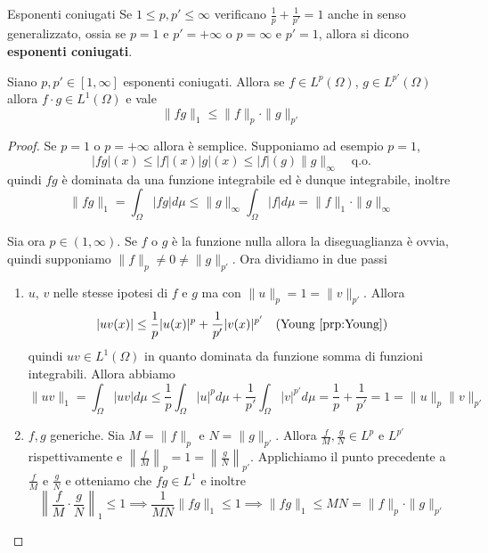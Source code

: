 \begin{definition}[label=def:coniugati]{Esponenti coniugati}
    Se \(1 \le p, p' \le \infty\) verificano \(\frac{1}{p} + \frac{1}{p'} = 1\)
    anche in senso generalizzato, ossia se \(p = 1\) e \(p' = +\infty\) o \(p =
    \infty \) e \(p' = 1\), allora si dicono \textbf{esponenti coniugati}.
\end{definition}

\begin{theorem}\label{thm:Holder}
    Siano \(p, p' \in [1, \infty]\) esponenti coniugati. Allora se \(f \in
    L^{p}{(\Omega)}\), \(g \in L^{p'}{(\Omega)}\) allora \(f\cdot g \in
    L^{1}{(\Omega)}\) e vale
    \[
        \|fg\|_1 \le \|f\|_p \cdot \|g\|_{p'}
    \]
\end{theorem}
\begin{proof}
    Se \(p = 1\) o \(p = +\infty\) allora è semplice. Supponiamo
    ad esempio \(p = 1\), 
    \[
        |fg|{(x)} \le |f|{(x)}|g|{(x)} \le |f|{(g)} \|g\|_{\infty} \quad \text{
        q.o.}
    \]
    quindi \(fg\) è dominata da una funzione integrabile ed è dunque
    integrabile, inoltre
    \[
        \|fg\|_1 = \int_\Omega |fg| d\mu \le \|g\|_\infty \int_\Omega |f| d\mu = \|f\|_1 \cdot \|g\|_\infty
    \]

    Sia ora \(p \in (1, \infty)\). Se \(f\) o \(g\) è la funzione nulla allora
    la diseguaglianza è ovvia, quindi supponiamo \(\|f\|_p \neq 0 \neq
    \|g\|_{p'} \). Ora dividiamo in due passi
\begin{enumerate}[label = \arabic*.]
    \item \(u\), \(v\) nelle stesse ipotesi di \(f\) e \(g\) ma con \(\|u\|_p =
        1 = \|v\|_{p'} \). Allora
        \[
            |uv{(x)}| \le  \frac{1}{p}|u{(x)}|^{p} + \frac{1}{ p' }|v{(x)}|^{p'}
            \quad \text{(Young~\ref{prp:Young})}
        \]
        quindi \(uv \in L^{1}(\Omega)\) in quanto dominata da funzione somma di
        funzioni integrabili. Allora abbiamo
        \[
            \|uv\|_1 = \int_\Omega |uv| d\mu \le \frac{1}{p} \int_\Omega |u|^{p} d\mu +
            \frac{1}{p'} \int_\Omega |v|^{p'} d\mu = \frac{1}{p} + \frac{1}{p'}
            = 1 = \|u\|_p \|v\|_{p'}
        \]
    \item \(f, g\) generiche. Sia \(M = \|f\|_p\) e \(N = \|g\|_{p'}\). Allora
        \(\frac{f}{M}, \frac{g}{N} \in L^{p}\) e \(L^{p'}\) rispettivamente e
        \(\left\| \frac{f}{M} \right\|_p = 1 = \left\| \frac{g}{N} \right\|_{p'}\).
        Applichiamo il punto precedente a \(\frac{f}{M}\) e \(\frac{g}{N}\) e
        otteniamo che \(fg \in L^{1}\) e inoltre
        \[
            \left\| \frac{f}{M} \cdot \frac{g}{N} \right\|_1 \le 1 \implies
            \frac{1}{MN} \|fg\|_1 \le 1 \implies \|fg\|_1 \le MN = \|f\|_p \cdot
            \|g\|_{p'}
        \]
\end{enumerate}
\end{proof}

